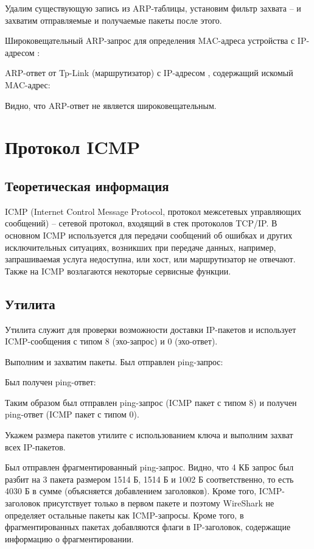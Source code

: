 Удалим существующую запись из ARP-таблицы, установим фильтр захвата --  и захватим отправляемые и получаемые пакеты после этого. 

Широковещательный ARP-запрос для определения MAC-адреса устройства с IP-адресом :

ARP-ответ от Tp-Link (маршрутизатор) с IP-адресом , содержащий искомый MAC-адрес:

Видно, что ARP-ответ не является широковещательным.

\section{Протокол ICMP}

\subsection{Теоретическая информация}

ICMP (Internet Control Message Protocol, протокол межсетевых управляющих сообщений) -- сетевой протокол, входящий в стек протоколов TCP/IP. В основном ICMP используется для передачи сообщений об ошибках и других исключительных ситуациях, возникших при передаче данных, например, запрашиваемая услуга недоступна, или хост, или маршрутизатор не отвечают. Также на ICMP возлагаются некоторые сервисные функции.

\subsection{Утилита }

Утилита  служит для проверки возможности доставки IP-пакетов и использует ICMP-сообщения с типом 8 (эхо-запрос) и 0 (эхо-ответ).

Выполним  и захватим пакеты. Был отправлен ping-запрос:

\newpage

Был получен ping-ответ:

Таким образом был отправлен ping-запрос (ICMP пакет с типом 8) и получен ping-ответ (ICMP пакет с типом 0).

Укажем размера пакетов утилите  с использованием ключа  и выполним захват всех IP-пакетов.

Был отправлен фрагментированный ping-запрос. Видно, что 4 КБ запрос был разбит на 3 пакета размером 1514 Б, 1514 Б и 1002 Б соответственно, то есть 4030 Б в сумме (объясняется добавлением заголовков). Кроме того, ICMP-заголовок присутствует только в первом пакете и поэтому WireShark не определяет остальные пакеты как ICMP-запросы. Кроме того, в фрагментированных пакетах добавляются флаги в IP-заголовок, содержащие информацию о фрагментировании.

